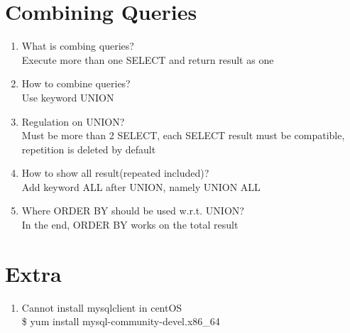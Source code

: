 \documentclass[10pt,a4paper,oneside]{article}
\begin{document}
\section{Combining Queries}
\begin{enumerate}[1.]
\item   What is combing queries?  \\
Execute more than one SELECT and return result as one
\item   How to combine queries?  \\
Use keyword UNION
\item   Regulation on UNION?  \\
Must be more than 2 SELECT, each SELECT result must be compatible, repetition is deleted by default
\item  How to show all result(repeated included)?   \\
Add keyword ALL after UNION, namely UNION ALL
\item  Where ORDER BY should be used w.r.t. UNION?    \\
In the end, ORDER BY works on the total result
\end{enumerate}
\section{Extra}
\begin{enumerate}[1.]
\item   Cannot install mysqlclient in centOS  \\
\$ yum install mysql-community-devel.x86\_64
\end{enumerate}
\end{document}

